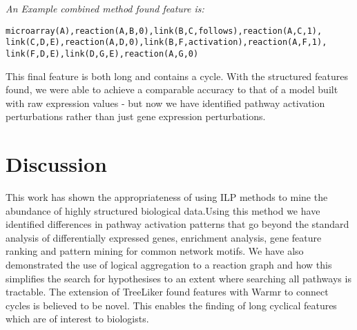\documentclass[runningheads,a4paper]{llncs}
\begin{document}
\noindent
{\it{An Example combined method found feature is:}}
\begin{verbatim}
microarray(A),reaction(A,B,0),link(B,C,follows),reaction(A,C,1),
link(C,D,E),reaction(A,D,0),link(B,F,activation),reaction(A,F,1),
link(F,D,E),link(D,G,E),reaction(A,G,0)
\end{verbatim}
\noindent
This final feature is both long and contains a cycle. With the structured features found, we were able to achieve a comparable accuracy to that of a model built with raw expression values - but now we have identified pathway activation perturbations rather than just gene expression perturbations. 

\section{Discussion}
This work has shown the appropriateness of using ILP methods to mine the abundance of highly structured biological data.Using this method we have identified differences in pathway activation patterns that go beyond the standard analysis of differentially expressed genes, enrichment analysis, gene feature ranking and pattern mining for common network motifs. We have also demonstrated the use of logical aggregation to a  reaction graph and how this simplifies the search for hypothesises to an extent where searching all pathways is tractable. The extension of TreeLiker found features with Warmr to connect cycles is believed to be novel. This enables the finding of long cyclical features which are of interest to biologists. 
\newline





\begingroup
\let\clearpage\relax
{}
\endgroup

%

%
%
\end{document}
